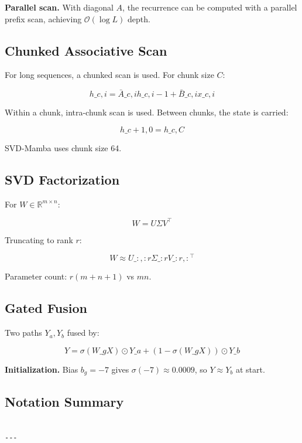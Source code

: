 \textbf{Parallel scan.} With diagonal $A$, the recurrence can be computed with 
a parallel prefix scan, achieving $\mathcal{O}(\log L)$ depth.

\subsection{Chunked Associative Scan}

For long sequences, a chunked scan is used. For chunk size $C$:

\[
h\_{c, i} = \bar{A}\_{c, i} h\_{c, i-1} + \bar{B}\_{c, i} x\_{c, i}
\tag{3.9}
\]

Within a chunk, intra-chunk scan is used. Between chunks, the state is 
carried:

\[
h\_{c+1, 0} = h\_{c, C}
\tag{3.10}
\]

SVD-Mamba uses chunk size 64.

\subsection{SVD Factorization}

For $W \in \mathbb{R}^{m \times n}$:

\[
W = U \Sigma V^\top
\tag{3.11}
\]

Truncating to rank $r$:

\[
W \approx U\_{:, :r} \Sigma\_{:r} V\_{:r, :}^\top
\tag{3.12}
\]

Parameter count: $r(m + n + 1)$ vs $mn$.

\subsection{Gated Fusion}

Two paths $Y_a, Y_b$ fused by:

\[
Y = \sigma(W\_g X) \odot Y\_a + (1 - \sigma(W\_g X)) \odot Y\_b
\tag{3.13}
\]

\textbf{Initialization.} Bias $b_g = -7$ gives $\sigma(-7) \approx 0.0009$, so 
$Y \approx Y_b$ at start.

\subsection{Notation Summary}

\begin{lstlisting}

---
\end{lstlisting}


